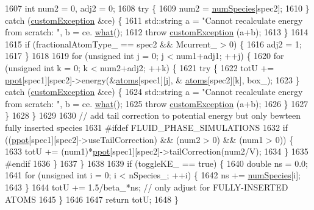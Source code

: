 \begin{DoxyCode}
1607             \textcolor{keywordtype}{int} num2 = 0, adj2 = 0;
1608             \textcolor{keywordflow}{try} \{
1609                 num2 = \hyperlink{classsim_system_a9eea865e6dc1cff377b1e79c4d9c23f0}{numSpecies}[spec2];
1610             \} \textcolor{keywordflow}{catch} (\hyperlink{classcustom_exception}{customException} &ce) \{
1611                 std::string a = \textcolor{stringliteral}{"Cannot recalculate energy from scratch: "}, b = ce.
      \hyperlink{classcustom_exception_aeb6ab5848b038adfc68fde86a512f691}{what}();
1612                 \textcolor{keywordflow}{throw} \hyperlink{classcustom_exception}{customException} (a+b);
1613             \}
1614 
1615             \textcolor{keywordflow}{if} (fractionalAtomType\_ == spec2 && Mcurrent\_ > 0) \{
1616                 adj2 = 1;
1617             \}
1618 
1619             \textcolor{keywordflow}{for} (\textcolor{keywordtype}{unsigned} \textcolor{keywordtype}{int} j = 0; j < num1+adj1; ++j) \{
1620                 \textcolor{keywordflow}{for} (\textcolor{keywordtype}{unsigned} \textcolor{keywordtype}{int} k = 0; k < num2+adj2; ++k) \{
1621                     \textcolor{keywordflow}{try} \{
1622                         totU += \hyperlink{classsim_system_ad2e290b5963f132e6a3a56cee35c8e9f}{ppot}[spec1][spec2]->energy(&\hyperlink{classsim_system_a90421b19082f7fb8fc23b7264b1161e4}{atoms}[spec1][j], &
      \hyperlink{classsim_system_a90421b19082f7fb8fc23b7264b1161e4}{atoms}[spec2][k], box\_);
1623                     \} \textcolor{keywordflow}{catch} (\hyperlink{classcustom_exception}{customException} &ce) \{
1624                         std::string a = \textcolor{stringliteral}{"Cannot recalculate energy from scratch: "}, b = ce.
      \hyperlink{classcustom_exception_aeb6ab5848b038adfc68fde86a512f691}{what}();
1625                         \textcolor{keywordflow}{throw} \hyperlink{classcustom_exception}{customException} (a+b);
1626                     \}
1627                 \}
1628             \}
1629 
1630             \textcolor{comment}{// add tail correction to potential energy but only bewteen fully inserted species}
1631 \textcolor{preprocessor}{#ifdef FLUID\_PHASE\_SIMULATIONS}
1632 \textcolor{preprocessor}{}            \textcolor{keywordflow}{if} ((\hyperlink{classsim_system_ad2e290b5963f132e6a3a56cee35c8e9f}{ppot}[spec1][spec2]->useTailCorrection) && (num2 > 0) && (num1 > 0)) \{
1633                 totU += (num1)*\hyperlink{classsim_system_ad2e290b5963f132e6a3a56cee35c8e9f}{ppot}[spec1][spec2]->tailCorrection(num2/V);
1634             \}
1635 \textcolor{preprocessor}{#endif}
1636 \textcolor{preprocessor}{}        \}
1637     \}
1638 
1639     \textcolor{keywordflow}{if} (toggleKE\_ == \textcolor{keyword}{true}) \{
1640         \textcolor{keywordtype}{double} ns = 0.0;
1641         \textcolor{keywordflow}{for} (\textcolor{keywordtype}{unsigned} \textcolor{keywordtype}{int} i = 0; i < nSpecies\_; ++i) \{
1642             ns += \hyperlink{classsim_system_a9eea865e6dc1cff377b1e79c4d9c23f0}{numSpecies}[i];
1643         \}
1644         totU += 1.5/beta\_*ns; \textcolor{comment}{// only adjust for FULLY-INSERTED ATOMS}
1645     \}
1646 
1647     \textcolor{keywordflow}{return} totU;
1648 \}
\end{DoxyCode}
